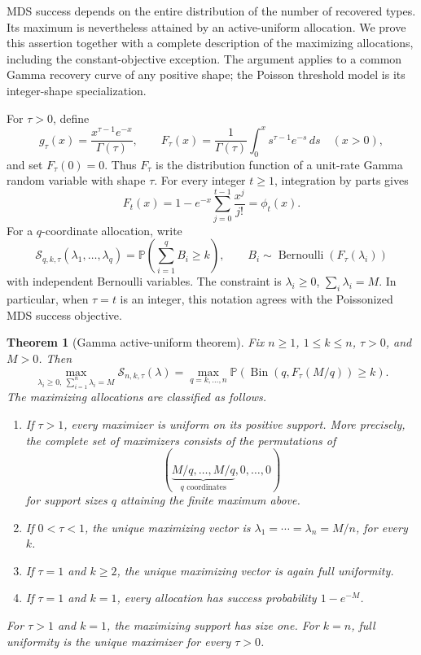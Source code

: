 \documentclass[11pt]{article}
\newtheorem{theorem}{Theorem}[section]
\theoremstyle{definition}
\theoremstyle{remark}
\DeclareMathOperator{\Bernoulli}{Bernoulli}
\DeclareMathOperator{\Bin}{Bin}
\newcommand{\Pbb}{\mathbb P}
\newcommand{\1}{\mathbf 1}
\begin{document}
MDS success depends on the entire distribution of the number of recovered types. Its maximum is nevertheless attained by an active-uniform allocation. We prove this assertion together with a complete description of the maximizing allocations, including the constant-objective exception. The argument applies to a common Gamma recovery curve of any positive shape; the Poisson threshold model is its integer-shape specialization.

For \(\tau>0\), define
\[
  g_\tau(x)=\frac{x^{\tau-1}e^{-x}}{\Gamma(\tau)},
  \qquad
  F_\tau(x)=\frac{1}{\Gamma(\tau)}
       \int_0^x s^{\tau-1}e^{-s}\,ds
  \quad(x>0),
\]
and set \(F_\tau(0)=0\).  Thus \(F_\tau\) is the distribution function of a unit-rate Gamma random variable with shape \(\tau\).  For every integer \(t\ge1\), integration by parts gives
\[
  F_t(x)=1-e^{-x}\sum_{j=0}^{t-1}\frac{x^j}{j!}
        =\phi_t(x).
\]
For a \(q\)-coordinate allocation, write
\[
  \mathcal S_{q,k,\tau}(\lambda_1,\ldots,\lambda_q)
  =\Pbb\left(\sum_{i=1}^q B_i\ge k\right),
  \qquad B_i\sim\Bernoulli(F_\tau(\lambda_i))
\]
with independent Bernoulli variables.  The constraint is
\(\lambda_i\ge0\), \(\sum_i\lambda_i=M\).  In particular, when \(\tau=t\) is an integer, this notation agrees with the Poissonized MDS success objective.

\begin{theorem}[Gamma active-uniform theorem]
\label{thm:gamma-active-uniform}
Fix \(n\ge1\), \(1\le k\le n\), \(\tau>0\), and \(M>0\).  Then
\[
  \max_{\lambda_i\ge0,\ \sum_{i=1}^n\lambda_i=M}
       \mathcal S_{n,k,\tau}(\lambda)
  =\max_{q=k,\ldots,n}
       \Pbb\left(\Bin(q,F_\tau(M/q))\ge k\right).
\]
The maximizing allocations are classified as follows.
\begin{enumerate}
\item If \(\tau>1\), every maximizer is uniform on its positive support.  More precisely, the complete set of maximizers consists of the permutations of
\[
  (\underbrace{M/q,\ldots,M/q}_{q\text{ coordinates}},0,\ldots,0)
\]
for support sizes \(q\) attaining the finite maximum above.
\item If \(0<\tau<1\), the unique maximizing vector is
\(\lambda_1=\cdots=\lambda_n=M/n\), for every \(k\).
\item If \(\tau=1\) and \(k\ge2\), the unique maximizing vector is again full uniformity.
\item If \(\tau=1\) and \(k=1\), every allocation has success probability \(1-e^{-M}\).
\end{enumerate}
For \(\tau>1\) and \(k=1\), the maximizing support has size one.  For \(k=n\), full uniformity is the unique maximizer for every \(\tau>0\).
\end{theorem}
\end{document}
